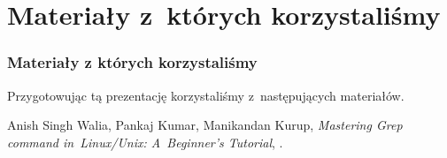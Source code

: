 \documentclass[10pt,t]{beamer}
\begin{document}























\section{Materiały z~których korzystaliśmy}


\begin{frame}
  \frametitle{Materiały z których korzystaliśmy}


  Przygotowując tą prezentację korzystaliśmy z~następujących materiałów.

  Anish Singh Walia, Pankaj Kumar, Manikandan Kurup, \textit{Mastering Grep
    command in~Linux/Unix: A~Beginner's Tutorial},
  \parencite{WKK-Mastering-Grep-command-in-Linux-Unix-ETC-Ver-2026}.

\end{frame}










\appendix

















\printbibliography





\end{document}
